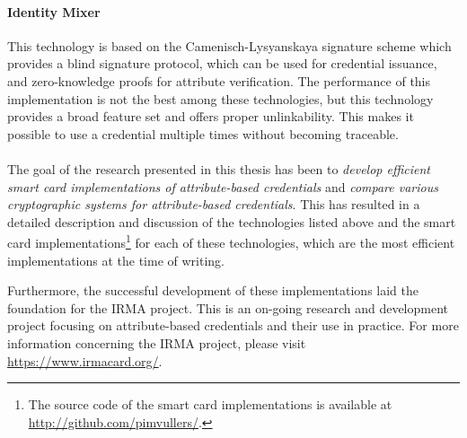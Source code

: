\paragraph{Identity Mixer}
This technology is based on the Camenisch-Lysyanskaya signature scheme 
which provides a blind signature protocol, which can be used for 
credential issuance, and zero-knowledge proofs for attribute verification. 
The performance of this implementation is not the best among these 
technologies, but this technology provides a broad feature set and offers 
proper unlinkability. This makes it possible to use a credential 
multiple times without becoming traceable.

\paragraph{}
The goal of the research presented in this thesis has been to \emph{develop 
efficient smart card implementations of attribute-based credentials} and 
\emph{compare various cryptographic systems for attribute-based credentials}. 
This has resulted in a detailed description and discussion of the
technologies listed above and the smart card implementations\footnote{The
source code of the smart card implementations is available at 
\url{http://github.com/pimvullers/}.} for each of these technologies, which are
the most efficient implementations at the time of writing.

Furthermore, the successful development of these implementations laid
the foundation for the IRMA project. This is an on-going research and
development project focusing on attribute-based credentials and their
use in practice. For more information concerning the IRMA project,
please visit \url{https://www.irmacard.org/}.